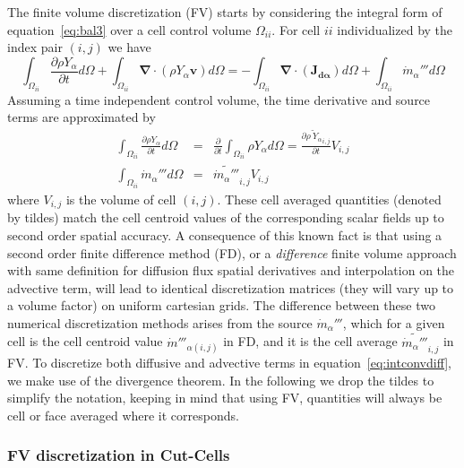 \documentclass[12pt]{article}
\begin{document}
The finite volume discretization (FV) starts by considering the integral form of equation~\eqref{eq:bal3} over a cell control volume $\Omega_{ii}$. For
cell $ii$ individualized by the index pair $(i,j)$ we have
%
\begin{equation}
 \int_{\Omega_{ii}} {\frac{\partial \rho Y_\alpha}{\partial t}} d \Omega + \int_{\Omega_{ii}} { \boldsymbol{\nabla} \cdot  \left(  \rho Y_\alpha \mathbf{v} \right)
      } d \Omega  = -\int_{\Omega_{ii}} { \boldsymbol{\nabla} \cdot \left(  \mathbf{J_{d \alpha}}  \right)  } d \Omega + \int_{\Omega_{ii}} { \dot{m}_\alpha''' } d \Omega \label{eq:intconvdiff}
\end{equation}
%
Assuming a time independent control volume, the time derivative and source terms are approximated by
%
\begin{eqnarray}
  \int_{\Omega_{ii}} {\frac{\partial \rho Y_\alpha}{\partial t}} d \Omega & = & \frac{\partial}{\partial t} \int_{\Omega_{ii}} {\rho Y_\alpha} d \Omega
  = \frac{\partial \widetilde{\rho \: Y_\alpha }_{i,j}}{\partial t} V_{i,j} \\
  \int_{\Omega_{ii}} { \dot{m}_\alpha''' } d \Omega & = & \widetilde{ \dot{m}_\alpha''' }_{i,j} V_{i,j} \label{eq:intcons}
\end{eqnarray}
%
where $V_{i,j}$ is the volume of cell $(i,j)$. These cell averaged quantities (denoted by tildes) match the cell centroid values of the corresponding scalar fields up to second order spatial accuracy. A consequence of this known fact is that using a second order finite difference method (FD), or a \textit{difference} finite volume approach with same definition
 for diffusion flux spatial derivatives and interpolation on the advective term, will lead to identical discretization matrices (they will vary up to a volume factor) on uniform cartesian grids. The difference between these two numerical discretization methods arises from the source $\dot{m}_\alpha''' $, which for a given cell is the cell centroid value $\dot{m}'''_{\alpha (i,j)}$ in FD, and it is the cell average $ \widetilde{ \dot{m}_\alpha''' }_{i,j}$ in FV. To discretize both diffusive and advective terms in equation~\eqref{eq:intconvdiff}, we make use of the divergence theorem. In the following we drop the tildes to simplify the notation, keeping in mind that using FV, quantities will always be cell or face averaged where it corresponds.


\subsubsection{FV discretization in Cut-Cells} \label{sec:cc}
\end{document}
